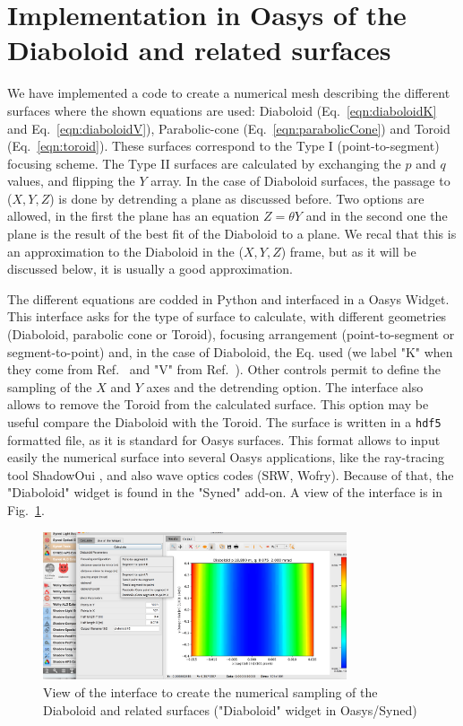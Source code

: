 \documentclass[a4paper, 11pt]{article}
\begin{document}
\section{Implementation in Oasys of the Diaboloid and related surfaces}

We have implemented a code to create a numerical mesh describing the different surfaces where the shown equations are used: Diaboloid (Eq.~\ref{eqn:diaboloidK} and Eq.~\ref{eqn:diaboloidV}), Parabolic-cone (Eq.~\ref{eqn:parabolicCone}) and Toroid (Eq.~\ref{eqn:toroid}). These surfaces correspond to the Type I (point-to-segment) focusing scheme. The Type II surfaces are calculated by exchanging the $p$ and $q$ values, and flipping the $Y$ array. In the case of Diaboloid surfaces, the passage to ($X,Y,Z$) is done by detrending a plane as discussed before. Two options are allowed, in the first the plane has an equation $Z=\theta Y$ and in the second one the plane is the result of the best fit of the Diaboloid to a plane. We recal that this is an approximation to the Diaboloid in the ($X,Y,Z$) frame, but as it will be discussed below, it is usually a good approximation.

The different equations are codded in Python and interfaced in a Oasys Widget. This interface asks for the type of surface to calculate, with different geometries (Diaboloid, parabolic cone or Toroid), focusing arrangement (point-to-segment or segment-to-point) and, in the case of Diaboloid, the Eq. used (we label "K" when they come from Ref.~\cite{Goldberg2020} and "V" from Ref.~\cite{Valeriy2020b}). Other controls permit to define the sampling of the $X$ and $Y$ axes and the detrending option. The interface also allows to remove the Toroid from the calculated surface. This option may be useful compare the Diaboloid with the Toroid. The surface is written in a {\tt hdf5} formatted file, as it is standard for Oasys surfaces. This format allows to input easily the numerical surface into several Oasys applications, like the ray-tracing tool ShadowOui \cite{codeSHADOWOUI}, and also wave optics codes (SRW, Wofry). Because of that, the "Diaboloid" widget is found in the "Syned" add-on. A view of the interface is in Fig.~\ref{fig:widget}.

\begin{figure}[h]
\centering
\includegraphics[width=0.8\textwidth]{figures/widget.png}
\caption{\label{fig:widget}View of the interface to create the numerical sampling of the Diaboloid and related surfaces ("Diaboloid" widget in Oasys/Syned) }
\end{figure}
\end{document}
